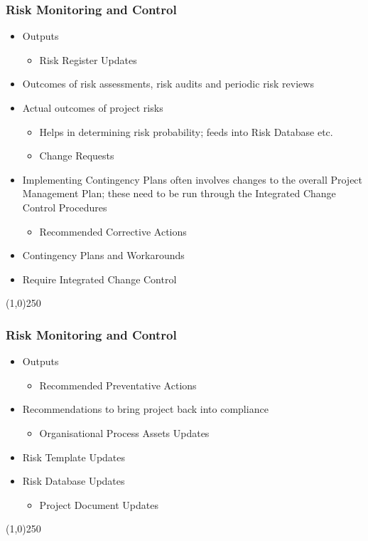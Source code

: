 \begin{frame}
\frametitle{Risk Monitoring and Control}
\begin{itemize}
\item Outputs
\begin{itemize}
	\item Risk Register Updates
\end{itemize}
 
\item Outcomes of risk assessments, risk audits and periodic risk reviews
\item Actual outcomes of project risks
\begin{itemize}
	\item Helps in determining risk probability; feeds into Risk Database etc.
\item Change Requests
\end{itemize}
\item Implementing Contingency Plans often involves changes to the overall Project Management Plan; these need to be run through the Integrated Change Control Procedures
\begin{itemize}
	\item Recommended Corrective Actions
\end{itemize}
\item Contingency Plans and Workarounds
\item Require Integrated Change Control
\end{itemize}
\end{frame}\begin{center}\line(1,0){250}\end{center}


\begin{frame}
\frametitle{Risk Monitoring and Control}
\begin{itemize}
\item Outputs
\begin{itemize}
	\item Recommended Preventative Actions
\end{itemize}
\item Recommendations to bring project back into compliance
\begin{itemize}
	\item Organisational Process Assets Updates
\end{itemize}
\item Risk Template Updates
\item Risk Database Updates
\begin{itemize}
	\item Project Document Updates
\end{itemize}
\end{itemize}
\end{frame}\begin{center}\line(1,0){250}\end{center}



